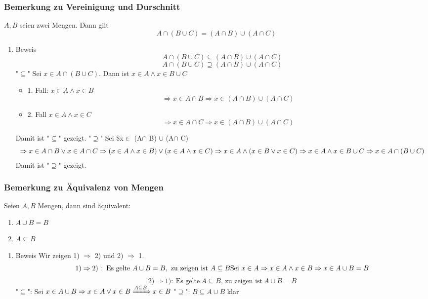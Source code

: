 \documentclass[11pt]{article}
\begin{document}
\subsubsection{Bemerkung zu Vereinigung und Durschnitt}
\label{sec-2-4-9}
$A,B$ seien zwei Mengen. Dann gilt \[A\cap (B\cup C) = (A\cap B) \cup (A\cap C)\]
\begin{enumerate}
\item Beweis
\label{sec-2-4-9-1}
\[A\cap(B\cup C) \subseteq (A\cap B) \cup (A\cap C)\]
\[A\cap(B\cup C) \supseteq (A\cap B) \cup (A\cap C)\]
"$\subseteq$" Sei $x\in A \cap (B\cup C)$. Dann ist $x\in A \wedge x\in B\cup C$
\begin{itemize}
\item 1. Fall: $x\in A \wedge x\in B$
       \[\Rightarrow x\in A\cap B \Rightarrow x \in (A\cap B) \cup (A\cap C)\]
\item 2. Fall $x\in A \wedge x\in C$
       \[\Rightarrow x\in A\cap C \Rightarrow x\in (A\cap B)\cup(A\cap C)\]
\end{itemize}
Damit ist "$\subseteq$" gezeigt.
"$\supseteq$" Sei \$x$\in$ (A$\cap$ B) $\cup$ (A$\cap$ C)
\[\Rightarrow x\in A\cap B \vee x\in A\cap C \\ \Rightarrow (x\in A \wedge x\in B) \vee (x\in A \wedge x\in C) \\ \Rightarrow x\in A \wedge (x\in B\vee x\in C) \\ \Rightarrow x\in A \wedge x\in B\cup C \\ \Rightarrow x\in A\cap (B\cup C)\]
Damit ist "$\supseteq$" gezeigt.
\end{enumerate}
\subsubsection{Bemerkung zu Äquivalenz von Mengen}
\label{sec-2-4-10}
Seien $A,B$ Mengen, dann sind äquivalent:
\begin{enumerate}
\item $A\cup B = B$
\item $A\subseteq B$
\end{enumerate}
\begin{enumerate}
\item Beweis
\label{sec-2-4-10-1}
Wir zeigen 1) $\Rightarrow$ 2) und 2) $\Rightarrow$ 1.
\[1) \Rightarrow 2):~\text{Es gelte}~A\cup B = B,~\text{zu zeigen ist}~A\subseteq B \\ \text{Sei}~x\in A \Rightarrow x\in A \wedge x \in B \Rightarrow x\in A\cup B = B\]
\[2) \Rightarrow 1):~\text{Es gelte}~A\subseteq B\text{, zu zeigen ist}~A\cup B = B \]
"$\subseteq$": Sei $x\in A\cup B \Rightarrow x\in A \vee x\in B \xRightarrow{A\subseteq B} x\in B$
"$\supseteq$": $B\subseteq A\cup B$ klar
\end{enumerate}
\end{document}
